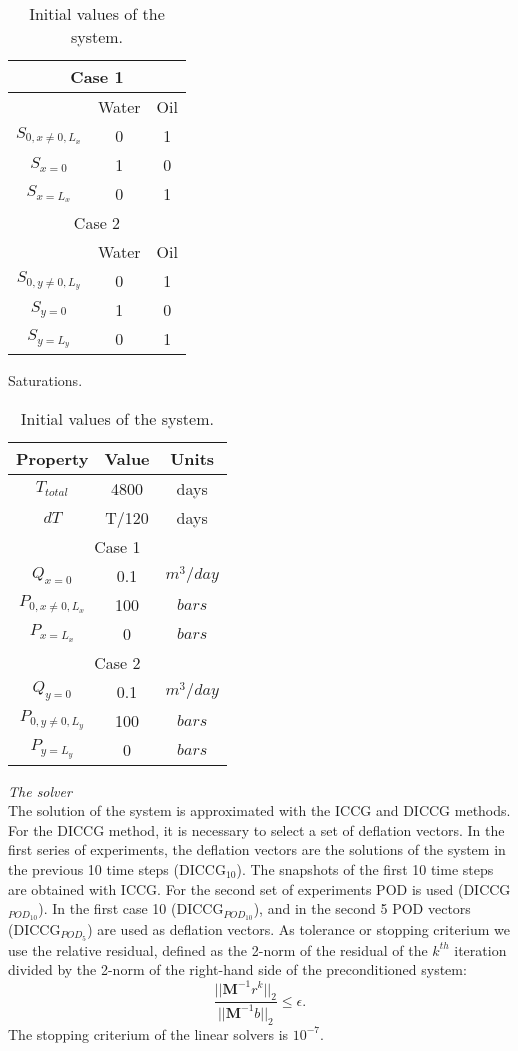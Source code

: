 \documentclass[12pt]{article}
\begin{document}
\begin{table}[!ht]
\begin{minipage}{.4\textwidth}
\centering
\begin{tabular}{ |c|c|c|} 
\hline
\multicolumn{3}{|c|}{Case 1}\\
\hline
&Water&Oil\\
\hline
$S_{0,x\neq 0, L_x}$&0&1\\
$S_{x=0}$&1&0\\
$S_{x=L_x}$&0&1\\
\hline
\multicolumn{3}{|c|}{Case 2}\\
\hline
&Water&Oil\\
\hline
$S_{0,y\neq 0, L_y}$&0&1\\
$S_{y=0}$&1&0\\
$S_{y=L_y}$&0&1\\
\hline
\end{tabular}
\caption{Saturations.}\label{table:sat}
\end{minipage}%
\hspace{1cm}
\begin{minipage}{.4\textwidth}
\centering
\begin{tabular}{ |c|c|c|} 
\hline
Property&Value&Units\\
\hline
    $T_{total}$&     4800& days\\
$dT$& T/120&days\\
\hline
\multicolumn{3}{|c|}{Case 1}\\
\hline
$Q_{x=0}$&0.1&$m^3/day$\\
$P_{0,x\neq 0, L_x}$&100&$bars$\\
$P_{x=L_x}$&0&$bars$\\
\hline
\multicolumn{3}{|c|}{Case 2}\\
 \hline
 $Q_{y=0}$&0.1&$m^3/day$\\
$P_{0,y\neq 0, L_y}$&100&$bars$\\
$P_{y=L_y}$&0&$bars$\\
\hline
\end{tabular}\caption{Initial values of the system.}
\label{table:ic}
\end{minipage}
\end{table} 

\emph{The solver}\\
The solution of the system is approximated with the ICCG and DICCG methods. \\
For the DICCG method, it is necessary to select a set of deflation vectors. In the first series of experiments, the deflation vectors are the solutions of the system in the previous 10 time steps (DICCG$_{10}$). The snapshots of the first 10 time steps are obtained with ICCG.
For the second set of experiments POD is used (DICCG$_{POD_{10}}$). In the first case 10 (DICCG$_{POD_{10}}$), and in the second 5 POD vectors (DICCG$_{POD_{5}}$) are used as deflation vectors.
As tolerance or stopping criterium we use the relative residual, defined as the 2-norm of the residual of the $k^{th}$ iteration divided by 
the 2-norm of the right-hand side of the preconditioned system: 
$$\frac{||\mathbf{M}^{-1}r^k||_2}{||\mathbf{M}^{-1}b||_2}\leq \epsilon.$$
The stopping criterium of the linear solvers is $10^{-7}$. 
\end{document}
